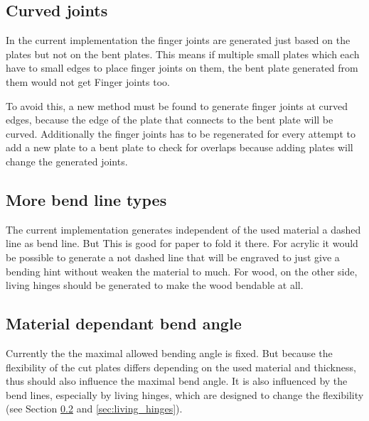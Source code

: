 \documentclass[../ClassicThesis.tex]{subfiles}
\begin{document}
\subsection{Curved joints}

In the current implementation the finger joints are generated just based on the plates but not on the bent plates. This means if multiple small plates which each have to small edges to place finger joints on them, the bent plate generated from them would not get Finger joints too.

To avoid this, a new method must be found to generate finger joints at curved edges, because the edge of the plate that connects to the bent plate  will be curved. Additionally the finger joints has to be regenerated for every attempt to add a new plate to a bent plate to check for overlaps because adding plates will change the generated joints.

\subsection{More bend line types}
\label{sec:more_bend_line_types}

The current implementation generates independent of the used material a dashed line as bend line. But This is good for paper to fold it there. For acrylic it would be possible to generate a not dashed line that will be engraved to just give a bending hint without weaken the material to much. For wood, on the other side, living hinges should be generated to make the wood bendable at all.

\subsection{Material dependant bend angle}
\label{sec:material_dependant_bend_angle}

Currently the the maximal allowed bending angle is fixed. But because the flexibility of the cut plates differs depending on the used material and thickness, thus should also influence the maximal bend angle. It is also influenced by the bend lines, especially by living hinges, which are designed to change the flexibility (see Section \ref{sec:more_bend_line_types} and \ref{sec:living_hinges}).
\end{document}
